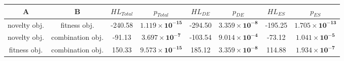 \begin{tabular}{cccccccc}
\toprule
           A &                B & ${HL}_{Total}$ &                      $p_{Total}$ & ${HL}_{DE}$ &                        $p_{DE}$ & ${HL}_{ES}$ &                         $p_{ES}$ \\
\midrule
novelty obj. &     fitness obj. &        -240.58 & $\mathbf{1.119 \times 10^{-15}}$ &     -294.50 & $\mathbf{3.359 \times 10^{-8}}$ &     -195.25 & $\mathbf{1.705 \times 10^{-13}}$ \\
novelty obj. & combination obj. &         -91.13 &  $\mathbf{3.697 \times 10^{-7}}$ &     -103.54 & $\mathbf{9.014 \times 10^{-4}}$ &      -73.12 &  $\mathbf{1.041 \times 10^{-5}}$ \\
fitness obj. & combination obj. &         150.33 & $\mathbf{9.573 \times 10^{-15}}$ &      185.12 & $\mathbf{3.359 \times 10^{-8}}$ &      114.88 &  $\mathbf{1.934 \times 10^{-7}}$ \\
\bottomrule
\end{tabular}
